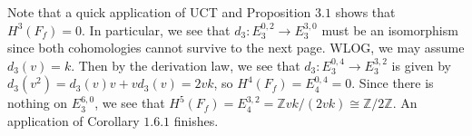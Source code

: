 \documentclass{article}
\theoremstyle{definition}
\theoremstyle{definition}
\theoremstyle{definition}
\theoremstyle{definition}
\theoremstyle{definition}
\theoremstyle{definition}
\theoremstyle{definition}
\begin{document}
Note that a quick application of UCT and Proposition $3.1$ shows that $H^3(F_f)=0$. In particular, we see that $d_3: E_3^{0,2}\to E_3^{3,0}$ must be an isomorphism since both cohomologies cannot survive to the next page. WLOG, we may assume $d_3(v)=k$. Then by the derivation law, we see that $d_3: E_3^{0,4}\to E_3^{3,2}$ is given by $d_3(v^2)=d_3(v)v+vd_3(v)=2vk$, so $H^4(F_f)=E_4^{0,4}=0$. Since there is nothing on $E_3^{6,0}$, we see that $H^5(F_f)=E_4^{3,2}=\mathbb{Z}vk/(2vk)\cong \mathbb{Z}/2 \mathbb{Z}$. An application of Corollary $1.6.1$ finishes.
\end{document}
